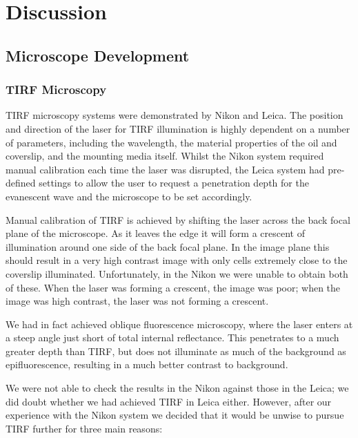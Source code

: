 \documentclass[../main.tex]{subfiles}
\begin{document}
\section{Discussion}

\subsection{Microscope Development}

\subsubsection{TIRF Microscopy}
TIRF microscopy systems were demonstrated by Nikon and Leica. The position and direction of the laser for TIRF illumination is highly dependent on a number of parameters, including the wavelength, the material properties of the oil and coverslip, and the mounting media itself. Whilst the Nikon system required manual calibration each time the laser was disrupted, the Leica system had pre-defined settings to allow the user to request a penetration depth for the evanescent wave and the microscope to be set accordingly.

Manual calibration of TIRF is achieved by shifting the laser across the back focal plane of the microscope. As it leaves the edge it will form a crescent of illumination around one side of the back focal plane. In the image plane this should result in a very high contrast image with only cells extremely close to the coverslip illuminated. Unfortunately, in the Nikon we were unable to obtain both of these. When the laser was forming a crescent, the image was poor; when the image was high contrast, the laser was not forming a crescent.

We had in fact achieved oblique fluorescence microscopy, where the laser enters at a steep angle just short of total internal reflectance. This penetrates to a much greater depth than TIRF, but does not illuminate as much of the background as epifluorescence, resulting in a much better contrast to background.

We were not able to check the results in the Nikon against those in the Leica; we did doubt whether we had achieved TIRF in Leica either. However, after our experience with the Nikon system we decided that it would be unwise to pursue TIRF further for three main reasons:
\end{document}
